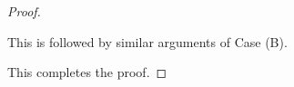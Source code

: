 \documentclass[10pt,a4paper]{amsart}
\begin{document}
\begin{proof}
\begin{itemize}
                This is followed by similar arguments of Case (B).
            \end{itemize}
            
            This completes the proof.
        \end{proof}
\end{document}
